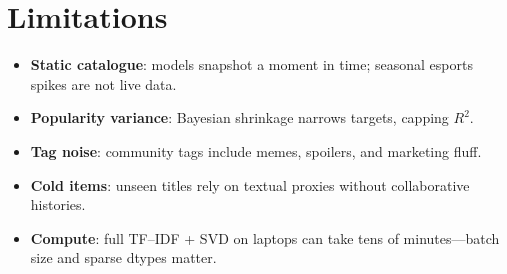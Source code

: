 \section{Limitations}
\begin{itemize}
\item \textbf{Static catalogue}: models snapshot a moment in time; seasonal esports spikes are not live data.
\item \textbf{Popularity variance}: Bayesian shrinkage narrows targets, capping $R^2$.
\item \textbf{Tag noise}: community tags include memes, spoilers, and marketing fluff.
\item \textbf{Cold items}: unseen titles rely on textual proxies without collaborative histories.
\item \textbf{Compute}: full TF--IDF + SVD on laptops can take tens of minutes—batch size and sparse dtypes matter.
\end{itemize}
